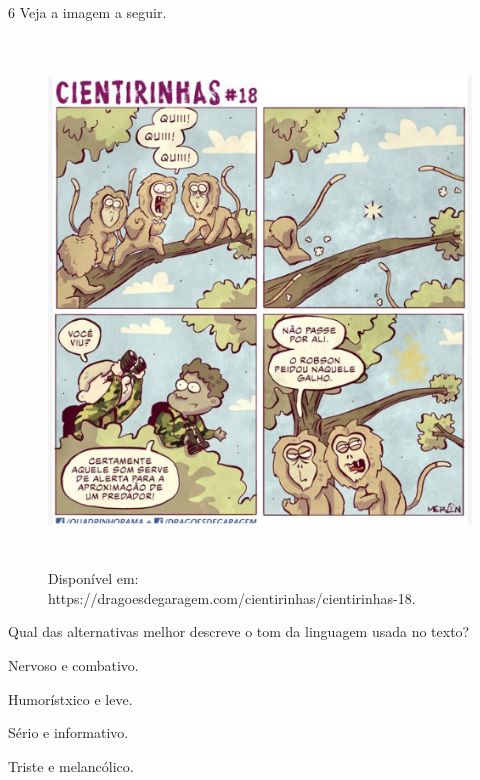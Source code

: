 \num{6} Veja a imagem a seguir.

\begin{figure}[H]
\centering\includegraphics[width=5.19864in,height=5.50077in]{./imgSAEB_6_POR/media/image41.png}
\caption{Disponível em: https://dragoesdegaragem.com/cientirinhas/cientirinhas-18.}
\end{figure}

\noindent Qual das alternativas melhor descreve o tom da linguagem usada no texto?

\begin{escolha}
\item Nervoso e combativo.
\item Humorístxico e leve.
\item Sério e informativo.
\item Triste e melancólico.
\end{escolha}



